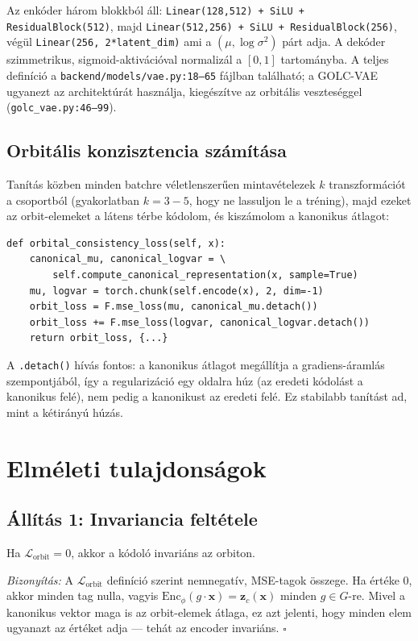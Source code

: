 Az enkóder három blokkból áll: \texttt{Linear(128,512) + SiLU + ResidualBlock(512)}, majd \texttt{Linear(512,256) + SiLU + ResidualBlock(256)}, végül \texttt{Linear(256, 2*latent\_dim)} ami a $(\mu, \log\sigma^2)$ párt adja. A dekóder szimmetrikus, sigmoid-aktivációval normalizál a $[0, 1]$ tartományba. A teljes definíció a \texttt{backend/models/vae.py:18--65} fájlban található; a GOLC-VAE ugyanezt az architektúrát használja, kiegészítve az orbitális veszteséggel (\texttt{golc\_vae.py:46--99}).

\subsection{Orbitális konzisztencia számítása}

Tanítás közben minden batchre véletlenszerűen mintavételezek $k$ transzformációt a csoportból (gyakorlatban $k = 3{-}5$, hogy ne lassuljon le a tréning), majd ezeket az orbit-elemeket a látens térbe kódolom, és kiszámolom a kanonikus átlagot:

\begin{lstlisting}
def orbital_consistency_loss(self, x):
    canonical_mu, canonical_logvar = \
        self.compute_canonical_representation(x, sample=True)
    mu, logvar = torch.chunk(self.encode(x), 2, dim=-1)
    orbit_loss = F.mse_loss(mu, canonical_mu.detach())
    orbit_loss += F.mse_loss(logvar, canonical_logvar.detach())
    return orbit_loss, {...}
\end{lstlisting}

A \texttt{.detach()} hívás fontos: a kanonikus átlagot megállítja a gradiens-áramlás szempontjából, így a regularizáció egy oldalra húz (az eredeti kódolást a kanonikus felé), nem pedig a kanonikust az eredeti felé. Ez stabilabb tanítást ad, mint a kétirányú húzás.

\section{Elméleti tulajdonságok}

\subsection{Állítás 1: Invariancia feltétele}

Ha $\mathcal{L}_{\text{orbit}} = 0$, akkor a kódoló invariáns az orbiton.

\textit{Bizonyítás:} A $\mathcal{L}_{\text{orbit}}$ definíció szerint nemnegatív, MSE-tagok összege. Ha értéke 0, akkor minden tag nulla, vagyis $\mathrm{Enc}_\phi(g \cdot \mathbf{x}) = \mathbf{z}_c(\mathbf{x})$ minden $g \in G$-re. Mivel a kanonikus vektor maga is az orbit-elemek átlaga, ez azt jelenti, hogy minden elem ugyanazt az értéket adja --- tehát az encoder invariáns. $\square$

